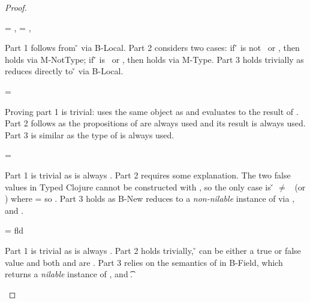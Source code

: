 \begin{lemma}
\begin{enumerate}
\begin{proof}
\begin{case}[T-Nil]
\end{case}

\begin{case}[T-Local]
\e{} = \x{}, \object{} = \x{}, \inpropenv{\propenv{}}{\isprop{\t{}}{\x{}}}

Part 1 follows from \inopenv{\openv{}}{\x{}} {\v{}} via B-Local.
Part 2 considers two cases: if \v{} is not \false\ or \nil, then 
\satisfies{\openv{}}{\notprop{\falsy}{\x{}}} holds via M-NotType; if \v{} is \false\ or \nil, then 
\satisfies{\openv{}}{\isprop{\falsy}{\x{}}} holds via M-Type.
Part 3 holds trivially as \x{} reduces directly to \v{} via B-Local.

\end{case}

\begin{case}[T-Do]
\e{} = { {}}

Proving part 1 is trivial: \e{} uses the same object as  and \e{}
evaluates to the result of .
Part 2 follows as the propositions of  are always used and its
result is always used.
Part 3 is similar as the type of  is always used.

\end{case}

\begin{case}[T-NewStatic]
  \e{} = { {\classhint{}} 
                                                          {\class{}} {}}

Part 1 is trivial as \object{} is always \emptyobject{}.
Part 2 requires some explanation. The two false values in Typed Clojure
cannot be constructed with \newliteral, so the only case is \v{} $\not=$ \false\ (or \nil)
where \thenprop{\prop{}} = \topprop{} so \satisfies{\openv{}}{\thenprop{\prop{}}}.
Part 3 holds as B-New reduces to a \emph{non-nilable}
instance of \class{} via \newjavaliteral, and \javatotc{\classhint{}}{\t{}}.
\end{case}

\begin{case}[T-FieldStatic]
  \e{} = { {} {fld} {\e{}}}

Part 1 is trivial as \object{} is always \emptyobject{}.
Part 2 holds trivially, \v{} can be either a true or false value
and both {\thenprop{\prop{}}} and {\elseprop{\prop{}}}
are \topprop{}.
Part 3 relies on the semantics of \getfieldliteral 
in B-Field, which returns a \emph{nilable} instance of ,
and  {\t{}}.
\end{case}


\end{proof}
\end{enumerate}
\end{lemma}
